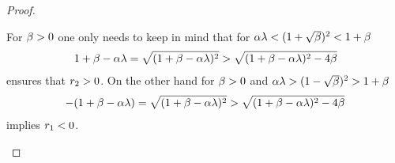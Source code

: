 \begin{proof}
\begin{description}[wide, labelindent=0pt]
		For \(\beta>0\) one only needs to keep in mind that for
		 \(\alpha\lambda < (1+\sqrt{\beta})^2 <1+\beta\)
		\begin{align*}
			1+\beta-\alpha\lambda = \sqrt{(1+\beta-\alpha\lambda)^2}
			> \sqrt{(1+\beta-\alpha\lambda)^2 - 4\beta}
		\end{align*}
		ensures that \(r_2 >0\). On the other hand for \(\beta>0\)
		and \(\alpha\lambda > (1-\sqrt{\beta})^2> 1+\beta\)
		\begin{align*}
			- (1+\beta-\alpha\lambda) = \sqrt{(1+\beta-\alpha\lambda)^2}
			> \sqrt{(1+\beta-\alpha\lambda)^2 - 4\beta}
		\end{align*}
		implies \(r_1 < 0\). \qedhere
 \end{description}
\end{proof}

